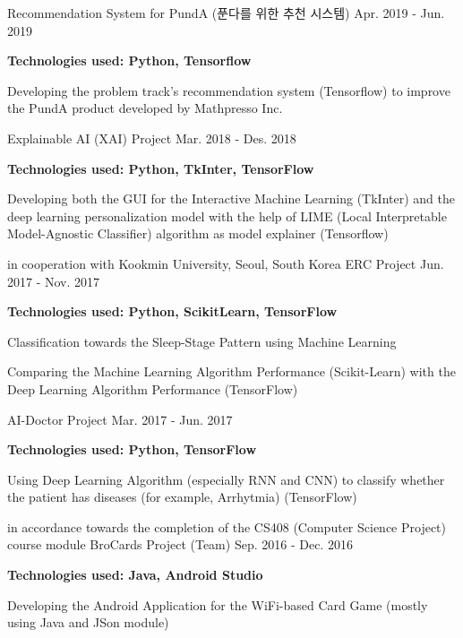 \begin{cventries}
	
	\cventry
	{}
	{Recommendation System for PundA (푼다를 위한 추천 시스템)}
	{Apr. 2019 - Jun. 2019}
	{}
	{
		\begin{cvitemsForEducation}
			\item[] {\textbf{Technologies used: Python, Tensorflow}}
			\item {Developing the problem track's recommendation system (Tensorflow) to improve the PundA product developed by Mathpresso Inc.}
		\end{cvitemsForEducation}
	}
	
	\cventry
    {}
    {Explainable AI (XAI) Project}
    {Mar. 2018 - Des. 2018}
    {}
    {
      \begin{cvitemsForEducation}
        \item[] {\textbf{Technologies used: Python, TkInter, TensorFlow}}
        \item {Developing both the GUI for the Interactive Machine Learning (TkInter) and the deep learning personalization model with the help of LIME (Local Interpretable Model-Agnostic Classifier) algorithm as model explainer (Tensorflow) }
      \end{cvitemsForEducation}
    }
	
	\cventry
	{in cooperation with Kookmin University, Seoul, South Korea}
	{ERC Project}
	{Jun. 2017 - Nov. 2017}
	{}
	{
		\begin{cvitemsForEducation}
			\item[] {}
			\item[] {\textbf{Technologies used: Python, ScikitLearn, TensorFlow}}
			\item {Classification towards the Sleep-Stage Pattern using Machine Learning}
			\item {Comparing the Machine Learning Algorithm Performance (Scikit-Learn) with the Deep Learning Algorithm Performance (TensorFlow)}
		\end{cvitemsForEducation}
	}

	\cventry
	{}
	{AI-Doctor Project}
	{Mar. 2017 - Jun. 2017}
	{}
	{
		\begin{cvitemsForEducation}
			\item[] {\textbf{Technologies used: Python, TensorFlow}}
			\item {Using Deep Learning Algorithm (especially RNN and CNN) to classify whether the patient has diseases (for example, Arrhytmia) (TensorFlow)}
		\end{cvitemsForEducation}
	}
	
	\cventry
	{in accordance towards the completion of the CS408 (Computer Science Project) course module}
	{BroCards Project (Team)}
	{Sep. 2016 - Dec. 2016}
	{}
	{
		\begin{cvitemsForEducation}
			\item[] {}
			\item[] {\textbf{Technologies used: Java, Android Studio}}
			\item {Developing the Android Application for the WiFi-based Card Game (mostly using Java and JSon module)}
		\end{cvitemsForEducation}
	}
	

\end{cventries}
